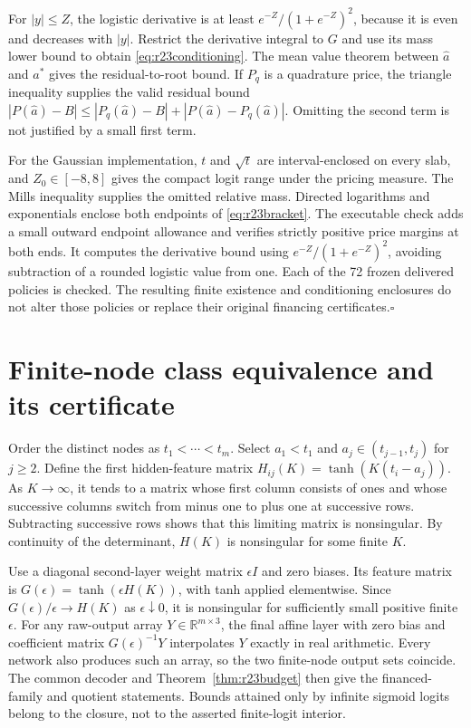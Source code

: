 For $|y|\leq Z$, the logistic derivative is at least $e^{-Z}/(1+e^{-Z})^2$, because it is even and decreases with $|y|$. Restrict the derivative integral to $G$ and use its mass lower bound to obtain \eqref{eq:r23conditioning}. The mean value theorem between $\widehat a$ and $a^*$ gives the residual-to-root bound. If $P_q$ is a quadrature price, the triangle inequality supplies the valid residual bound $|P(\widehat a)-B|\leq|P_q(\widehat a)-B|+|P(\widehat a)-P_q(\widehat a)|$. Omitting the second term is not justified by a small first term.

For the Gaussian implementation, $t$ and $\sqrt t$ are interval-enclosed on every slab, and $Z_0\in[-8,8]$ gives the compact logit range under the pricing measure. The Mills inequality supplies the omitted relative mass. Directed logarithms and exponentials enclose both endpoints of \eqref{eq:r23bracket}. The executable check adds a small outward endpoint allowance and verifies strictly positive price margins at both ends. It computes the derivative bound using $e^{-Z}/(1+e^{-Z})^2$, avoiding subtraction of a rounded logistic value from one. Each of the 72 frozen delivered policies is checked. The resulting finite existence and conditioning enclosures do not alter those policies or replace their original financing certificates.\hfill$\square$

\section{Finite-node class equivalence and its certificate}\label{app:r23class}
Order the distinct nodes as $t_1<\cdots<t_m$. Select $a_1<t_1$ and $a_j\in(t_{j-1},t_j)$ for $j\geq2$. Define the first hidden-feature matrix $H_{ij}(K)=\tanh(K(t_i-a_j))$. As $K\to\infty$, it tends to a matrix whose first column consists of ones and whose successive columns switch from minus one to plus one at successive rows. Subtracting successive rows shows that this limiting matrix is nonsingular. By continuity of the determinant, $H(K)$ is nonsingular for some finite $K$.

Use a diagonal second-layer weight matrix $\epsilon I$ and zero biases. Its feature matrix is $G(\epsilon)=\tanh(\epsilon H(K))$, with tanh applied elementwise. Since $G(\epsilon)/\epsilon\to H(K)$ as $\epsilon\downarrow0$, it is nonsingular for sufficiently small positive finite $\epsilon$. For any raw-output array $Y\in\mathbb R^{m\times3}$, the final affine layer with zero bias and coefficient matrix $G(\epsilon)^{-1}Y$ interpolates $Y$ exactly in real arithmetic. Every network also produces such an array, so the two finite-node output sets coincide. The common decoder and Theorem~\ref{thm:r23budget} then give the financed-family and quotient statements. Bounds attained only by infinite sigmoid logits belong to the closure, not to the asserted finite-logit interior.

